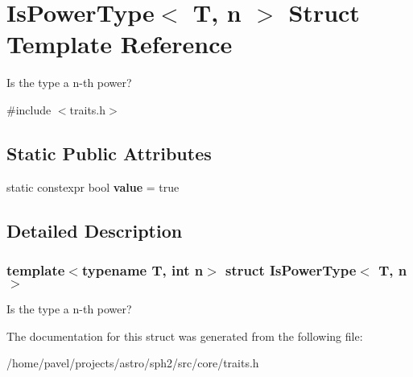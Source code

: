 \hypertarget{structIsPowerType}{}\section{Is\+Power\+Type$<$ T, n $>$ Struct Template Reference}
\label{structIsPowerType}


Is the type a n-\/th power?  




{\ttfamily \#include $<$traits.\+h$>$}

\subsection*{Static Public Attributes}
\begin{DoxyCompactItemize}
\item 
\hypertarget{structIsPowerType_ada1ae20e8cee5ef6f30d63944e9f8300}{}\label{structIsPowerType_ada1ae20e8cee5ef6f30d63944e9f8300} 
static constexpr bool {\bfseries value} = true
\end{DoxyCompactItemize}


\subsection{Detailed Description}
\subsubsection*{template$<$typename T, int n$>$\newline
struct Is\+Power\+Type$<$ T, n $>$}

Is the type a n-\/th power? 

The documentation for this struct was generated from the following file\+:\begin{DoxyCompactItemize}
\item 
/home/pavel/projects/astro/sph2/src/core/traits.\+h\end{DoxyCompactItemize}
